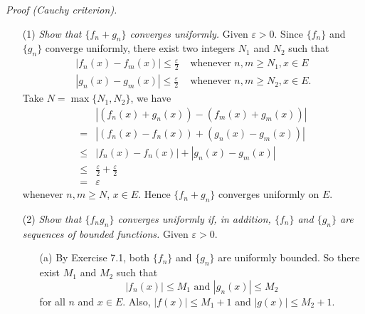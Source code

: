 \documentclass{article}
\begin{document}
\emph{Proof (Cauchy criterion).}
\begin{enumerate}
  \item[(1)]
  \emph{Show that $\{f_n + g_n\}$ converges uniformly.}
    Given $\varepsilon > 0$.
    Since $\{f_n\}$ and $\{g_n\}$ converge uniformly,
    there exist two integers $N_1$ and $N_2$ such that
    \begin{align*}
      |f_n(x) - f_m(x)| \leq \frac{\varepsilon}{2}
      &\text{ whenever }
      n,m \geq N_1, x \in E \\
      |g_n(x) - g_m(x)| \leq \frac{\varepsilon}{2}
      &\text{ whenever }
      n,m \geq N_2, x \in E.
    \end{align*}
    Take $N = \max\{N_1,N_2\}$, we have
    \begin{align*}
      &|(f_n(x)+ g_n(x)) - (f_m(x) + g_m(x))| \\
      =& |(f_n(x) - f_n(x)) + (g_n(x) - g_m(x))| \\
      \leq& |f_n(x) - f_n(x)| + |g_n(x) - g_m(x)| \\
      \leq& \frac{\varepsilon}{2} + \frac{\varepsilon}{2} \\
      =& \varepsilon
    \end{align*}
    whenever $n,m \geq N$, $x \in E$.
    Hence $\{f_n + g_n\}$ converges uniformly on $E$.

  \item[(2)]
  \emph{Show that $\{f_n g_n\}$ converges uniformly
  if, in addition, $\{f_n\}$ and $\{g_n\}$ are sequences of bounded functions.}
  Given $\varepsilon > 0$.
  \begin{enumerate}
    \item[(a)]
    By Exercise 7.1, both $\{f_n\}$ and $\{g_n\}$ are uniformly bounded.
    So there exist $M_1$ and $M_2$
    such that
    \[
      |f_n(x)| \leq M_1 \text{ and } |g_n(x)| \leq M_2
    \]
    for all $n$ and $x \in E$.
    Also, $|f(x)| \leq M_1 + 1$ and $|g(x)| \leq M_2 + 1$.


\end{enumerate}
\end{enumerate}
\end{document}
